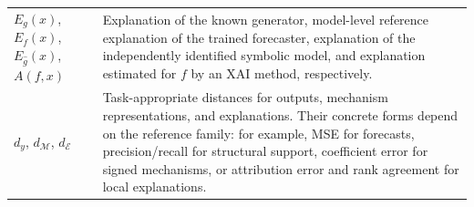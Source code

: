 \begin{longtable}{@{}
>{\raggedright\arraybackslash}p{}
>{\raggedright\arraybackslash}p{}@{}}
$E_g(x)$, $E_f(x)$, $E_{\widehat g}(x)$, $A(f,x)$ &
Explanation of the known generator, model-level reference explanation of the
trained forecaster, explanation of the independently identified symbolic
model, and explanation estimated for $f$ by an XAI method, respectively. \\

$d_y$, $d_{\mathcal M}$, $d_{\mathcal E}$ &
Task-appropriate distances for outputs, mechanism representations, and
explanations. Their concrete forms depend on the reference family: for
example, MSE for forecasts, precision/recall for structural support, coefficient
error for signed mechanisms, or attribution error and rank agreement for local
explanations. \\

\end{longtable}
\endgroup


